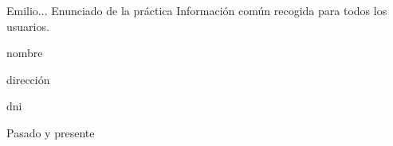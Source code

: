 {Emilio...}
{Enunciado de la práctica}
{}
{}
{Información común recogida para todos los usuarios.}
{
\item{nombre}
\item{dirección}
\item{dni}
}
{Pasado y presente}

